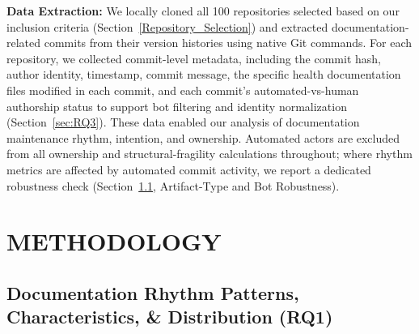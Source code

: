 \documentclass[10pt,conference]{IEEEtran}
\newcommand{\EAdejumo}[1]{\textcolor{red}{{\bfseries [[#1]]}}}
\begin{document}
\textbf{Data Extraction:}
We locally cloned all 100 repositories selected based on our inclusion criteria (Section~\ref{Repository_Selection}) and extracted documentation-related commits from their version histories using native Git commands. For each repository, we collected commit-level metadata, including the commit hash, author identity, timestamp, commit message, the specific health documentation files modified in each commit, and each commit's automated-vs-human authorship status to support bot filtering and identity normalization (Section~\ref{sec:RQ3}). These data enabled our analysis of documentation maintenance rhythm, intention, and ownership. Automated actors are excluded from all ownership and structural-fragility calculations throughout; where rhythm metrics are affected by automated commit activity, we report a dedicated robustness check (Section~\ref{sec:RQ1}, Artifact-Type and Bot Robustness).


\section{METHODOLOGY}
\subsection{ Documentation Rhythm Patterns, Characteristics, \& Distribution (RQ1) }\label{sec:RQ1}


\end{document}
